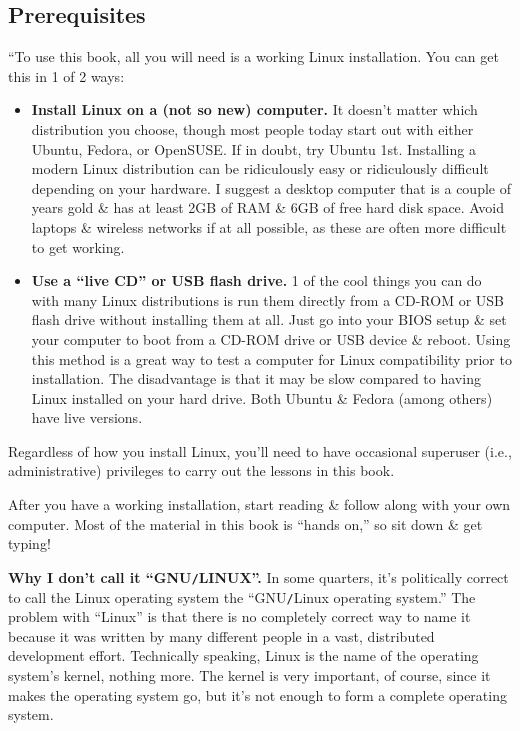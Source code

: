 \documentclass[oneside]{book}
\numberwithin{equation}{section}
\begin{document}
\subsection*{Prerequisites}
``To use this book, all you will need is a working Linux installation. You can get this in 1 of 2 ways:
\begin{itemize}
	\item \textbf{Install Linux on a (not so new) computer.} It doesn't matter which distribution you choose, though most people today start out with either Ubuntu, Fedora, or OpenSUSE. If in doubt, try Ubuntu 1st. Installing a modern Linux distribution can be ridiculously easy or ridiculously difficult depending on your hardware. I suggest a desktop computer that is a couple of years gold \& has at least 2GB of RAM \& 6GB of free hard disk space. Avoid laptops \& wireless networks if at all possible, as these are often more difficult to get working.
	\item \textbf{Use a ``live CD'' or USB flash drive.} 1 of the cool things you can do with many Linux distributions is run them directly from a CD-ROM or USB flash drive without installing them at all. Just go into your BIOS setup \& set your computer to boot from a CD-ROM drive or USB device \& reboot. Using this method is a great way to test a computer for Linux compatibility prior to installation. The disadvantage is that it may be slow compared to having Linux installed on your hard drive. Both Ubuntu \& Fedora (among others) have live versions.
\end{itemize}
Regardless of how you install Linux, you'll need to have occasional superuser (i.e., administrative) privileges to carry out the lessons in this book.

After you have a working installation, start reading \& follow along with your own computer. Most of the material in this book is ``hands on,'' so sit down \& get typing!

\textbf{Why I don't call it ``GNU\texttt{/}LINUX''.} In some quarters, it's politically correct to call the Linux operating system the ``GNU\texttt{/}Linux operating system.'' The problem with ``Linux'' is that there is no completely correct way to name it because it was written by many different people in a vast, distributed development effort. Technically speaking, Linux is the name of the operating system's kernel, nothing more. The kernel is very important, of course, since it makes the operating system go, but it's not enough to form a complete operating system.
\end{document}
